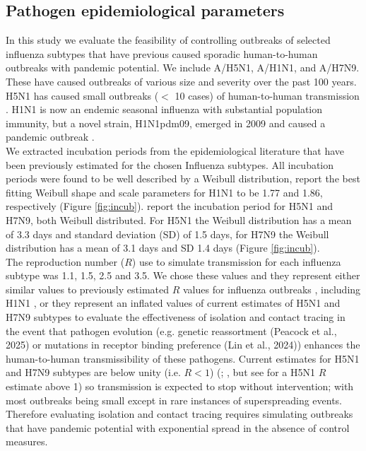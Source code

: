 \documentclass{article}
\begin{document}
\subsection*{Pathogen epidemiological parameters} \label{epiparameters}

In this study we evaluate the feasibility of controlling outbreaks of selected influenza subtypes that have previous caused sporadic human-to-human outbreaks with pandemic potential. We include A/H5N1, A/H1N1, and A/H7N9. These have caused outbreaks of various size and severity over the past 100 years. H5N1 has caused small outbreaks ($<$ 10 cases) of human-to-human transmission \citep{yangDetectingHumanhumanTransmission2007a, aditamaAvianInfluenzaH5N12012a}. H1N1 is now an endemic seasonal influenza with substantial population immunity, but a novel strain, H1N1pdm09, emerged in 2009 and caused a pandemic outbreak \citep{fraserPandemicPotentialStrain2009, lesslerOutbreak2009Pandemic2009}. \\

We extracted incubation periods from the epidemiological literature that have been previously estimated for the chosen Influenza subtypes. All incubation periods were found to be well described by a Weibull distribution, \cite{nishiuraEstimationIncubationPeriod2011} report the best fitting Weibull shape and scale parameters for H1N1 to be 1.77 and 1.86, respectively (Figure \ref{fig:incub}). \cite{cowlingComparativeEpidemiologyHuman2013} report the incubation period for H5N1 and H7N9, both Weibull distributed. For H5N1 the Weibull distribution has a mean of 3.3 days and standard deviation (SD) of 1.5 days, for H7N9 the Weibull distribution has a mean of 3.1 days and SD 1.4 days \citep{cowlingComparativeEpidemiologyHuman2013} (Figure \ref{fig:incub}). \\

The reproduction number ($R$) use to simulate transmission for each influenza subtype was 1.1, 1.5, 2.5 and 3.5. We chose these values and they represent either similar values to previously estimated $R$ values for influenza outbreaks \citep{fergusonStrategiesMitigatingInfluenza2006}, including H1N1 \citep{fraserPandemicPotentialStrain2009, lesslerOutbreak2009Pandemic2009}, or they represent an inflated values of current estimates of H5N1 and H7N9 subtypes to evaluate the effectiveness of isolation and contact tracing in the event that pathogen evolution (e.g. genetic reassortment (Peacock et al., 2025) or mutations in receptor binding preference (Lin et al., 2024)) enhances the human-to-human transmissibility of these pathogens. Current estimates for H5N1 and H7N9 subtypes are below unity (i.e. $R < 1$) (\citealt{tannerPandemicPotentialAvian2015}; \citealt{Ward2024.12.11.24318702}, but see \citealt{yangDetectingHumanhumanTransmission2007a} for a H5N1 $R$ estimate above 1) so transmission is expected to stop without intervention; with most outbreaks being small except in rare instances of superspreading events. Therefore evaluating isolation and contact tracing requires simulating outbreaks that have pandemic potential with exponential spread in the absence of control measures.
\end{document}
